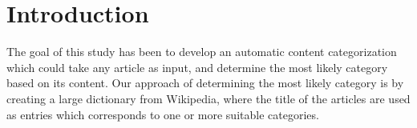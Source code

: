 \chapter{Introduction}
The goal of this study has been to develop an automatic content categorization which could take any article as input, and determine the most likely category based on its content. Our approach of determining the most likely category is by creating a large dictionary from Wikipedia, where the title of the articles are used as entries which corresponds to one or more suitable categories. 




